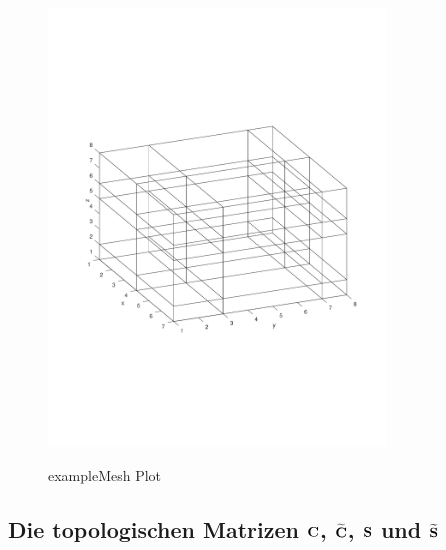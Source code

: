 \documentclass[Protokollheft.tex]{subfiles}
\begin{document}
	\begin{figure}[h]
	\centering
	\includegraphics[width=0.8\textwidth]{exmesh.pdf}
	\label{abb:example}
	\caption{exampleMesh Plot}
\end{figure}

%
    {\subsection{Die topologischen Matrizen $\mathbf{C}$, $\widetilde{\mathbf{C}}$, $\mathbf{S}$ und $\widetilde{\mathbf{S}}$}}
\end{document}
